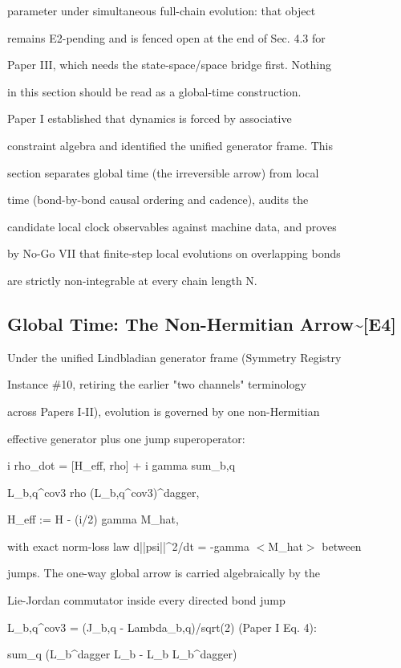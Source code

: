 \documentclass[11pt,a4paper]{article}
\theoremstyle{definition}
\begin{document}
parameter under simultaneous full-chain evolution: that object

remains E2-pending and is fenced open at the end of Sec. 4.3 for

Paper III, which needs the state-space/space bridge first. Nothing

in this section should be read as a global-time construction.


Paper I established that dynamics is forced by associative

constraint algebra and identified the unified generator frame. This

section separates global time (the irreversible arrow) from local

time (bond-by-bond causal ordering and cadence), audits the

candidate local clock observables against machine data, and proves

by No-Go VII that finite-step local evolutions on overlapping bonds

are strictly non-integrable at every chain length N.


\subsection{Global Time: The Non-Hermitian Arrow\textasciitilde{}[\textsc{E4}]}

Under the unified Lindbladian generator frame (Symmetry Registry

Instance \#10, retiring the earlier "two channels" terminology

across Papers I-II), evolution is governed by one non-Hermitian

effective generator plus one jump superoperator:


    i rho\_dot = [H\_eff, rho] + i gamma sum\_{b,q}

                L\_{b,q}\^{}{cov3} rho (L\_{b,q}\^{}{cov3})\^{}dagger,

    H\_eff := H - (i/2) gamma M\_hat,


with exact norm-loss law d||psi||\^{}2/dt = -gamma $<$M\_hat$>$ between

jumps. The one-way global arrow is carried algebraically by the

Lie-Jordan commutator inside every directed bond jump

L\_{b,q}\^{}{cov3} = (J\_{b,q} - Lambda\_{b,q})/sqrt(2) (Paper I Eq. 4):


    sum\_q (L\_b\^{}dagger L\_b - L\_b L\_b\^{}dagger)
\end{document}
